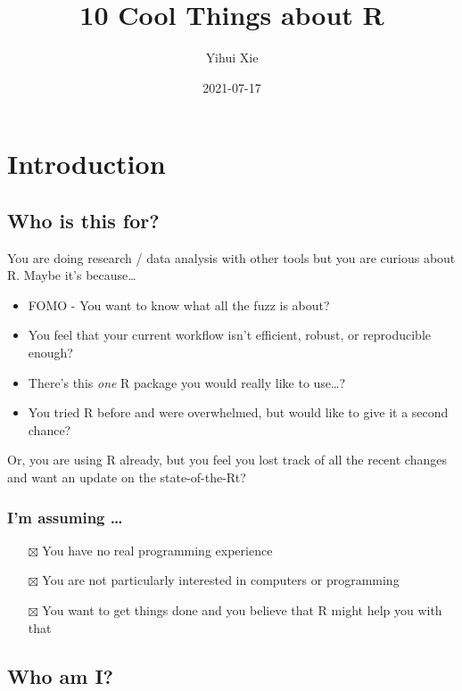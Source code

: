 \documentclass[
]{book}
\title{10 Cool Things about R}
\author{Yihui Xie}
\date{2021-07-17}
\providecommand{\tightlist}{%
  \setlength{\itemsep}{0pt}\setlength{\parskip}{0pt}}
\begin{document}
\frontmatter
\maketitle

\mainmatter
\hypertarget{introduction}{%
\chapter{Introduction}\label{introduction}}

\hypertarget{who-is-this-for}{%
\section{Who is this for?}\label{who-is-this-for}}

You are doing research / data analysis with other tools but you are
curious about R. Maybe it's because\ldots{}

\begin{itemize}
\tightlist
\item
  FOMO - You want to know what all the fuzz is about?
\item
  You feel that your current workflow isn't efficient, robust, or
  reproducible enough?
\item
  There's this \emph{one} R package you would really like to use\ldots?
\item
  You tried R before and were overwhelmed, but would like to give it a
  second chance?
\end{itemize}

Or, you are using R already, but you feel you lost track of all the
recent changes and want an update on the state-of-the-Rt?

\hypertarget{im-assuming}{%
\subsection{I'm assuming \ldots{}}\label{im-assuming}}

\begin{itemize}
\tightlist
\item[$\boxtimes$]
  You have no real programming experience
\item[$\boxtimes$]
  You are not particularly interested in computers or programming
\item[$\boxtimes$]
  You want to get things done and you believe that R might help you with
  that
\end{itemize}

\hypertarget{who-am-i}{%
\section{Who am I?}\label{who-am-i}}
\end{document}
